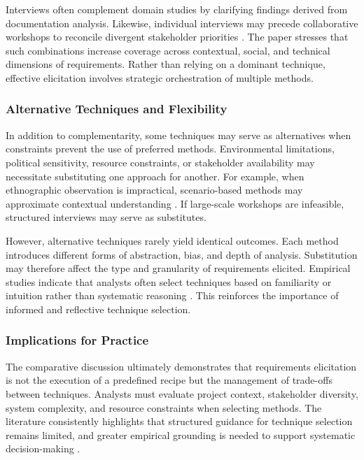 Interviews often complement domain studies by clarifying findings derived from documentation analysis. Likewise, individual interviews may precede collaborative workshops to reconcile divergent stakeholder priorities \cite{Gottesdiener2002}. The paper stresses that such combinations increase coverage across contextual, social, and technical dimensions of requirements. Rather than relying on a dominant technique, effective elicitation involves strategic orchestration of multiple methods.

\subsubsection{Alternative Techniques and Flexibility}

In addition to complementarity, some techniques may serve as alternatives when constraints prevent the use of preferred methods. Environmental limitations, political sensitivity, resource constraints, or stakeholder availability may necessitate substituting one approach for another. For example, when ethnographic observation is impractical, scenario-based methods may approximate contextual understanding \cite{Potts1994}. If large-scale workshops are infeasible, structured interviews may serve as substitutes.

However, alternative techniques rarely yield identical outcomes. Each method introduces different forms of abstraction, bias, and depth of analysis. Substitution may therefore affect the type and granularity of requirements elicited. Empirical studies indicate that analysts often select techniques based on familiarity or intuition rather than systematic reasoning \cite{Hickey2003}. This reinforces the importance of informed and reflective technique selection.

\subsubsection{Implications for Practice}

The comparative discussion ultimately demonstrates that requirements elicitation is not the execution of a predefined recipe but the management of trade-offs between techniques. Analysts must evaluate project context, stakeholder diversity, system complexity, and resource constraints when selecting methods. The literature consistently highlights that structured guidance for technique selection remains limited, and greater empirical grounding is needed to support systematic decision-making \cite{Nuseibeh2000}.

